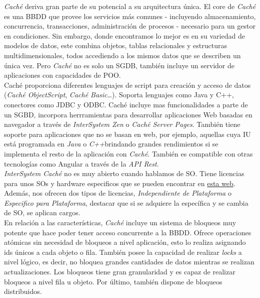 \documentclass[3pt]{article}
\begin{document}
\emph{Caché} deriva gran parte de su potencial a su arquitectura única. El core de \emph{Caché} es una BBDD que provee los servicios más comunes - incluyendo almacenamiento, concurrencia, transacciones, administración de procesos - necesario para un gestor en condiciones. Sin embargo, donde encontramos lo mejor es en su variedad de modelos de datos, este combina objetos, tablas relacionales y estructuras multidimensionales, todos accediendo a los mismos datos que se describen un única vez. Pero \emph{Caché} no es solo un SGDB, también incluye un servidor de aplicaciones con capacidades de POO. \cite{CACHE:3} \\
Caché proporciona diferentes lenguajes de script para creación y acceso de datos (\emph{Caché ObjectScript}, \emph{Caché Basic}…).  Soporta lenguajes como Java y C++, conectores como JDBC y ODBC.  Caché incluye mas funcionalidades a parte de un SGBD, incorpora herrramientas para desarrollar aplicaciones Web basadas en navegador a través de\emph{ InterSystem Zen} o \emph{Caché Server Pages}. También tiene soporte para aplicaciones que no se basan en web, por ejemplo, aquellas cuya IU está programada en \emph{Java} o \emph{C++}brindando grandes rendimientos si se implementa el resto de la aplicación con \emph{Caché}. También es compatible con otras tecnologías como Angular a través de la \emph{API Rest}.\\

\emph{InterSystem Caché }no es muy abierto cuando hablamos de SO. Tiene licencias para unos SOs y hardware especificos que se pueden encontrar en \href{https://www.intersystems.com/support-learning/support/cache-licensing-platforms/}{esta web}. Además, nos ofrecen dos tipos de licencias, \emph{Independiente de Plataforma} o \emph{Especifico para Plataforma}, destacar que si se adquiere la específica y se cambia de SO, se aplican cargos.\\

En relación a las características, \emph{Caché} incluye un sistema de bloqueos muy potente que hace poder tener acceso concurrente a la BBDD. Ofrece operaciones atómicas sin necesidad de bloqueos a nivel aplicación, esto lo realiza asignando ids únicos a cada objeto o fila. También posee la capacidad de realizar \emph{locks} a nivel lógico, es decir, no bloquea grandes cantidades de datos mientras se realizan actualizaciones. Los bloqueos tiene gran granularidad y es capaz de realizar bloqueos a nivel fila u objeto. Por último, también dispone de bloqueos distribuidos.\cite{CACHE:1}\\
\end{document}
